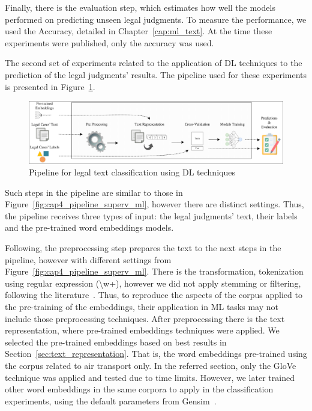 Finally, there is the evaluation step, which estimates how well the models performed on predicting unseen legal judgments. To measure the performance, we used the Accuracy, detailed in Chapter~\ref{cap:ml_text}. At the time these experiments were published, only the accuracy was used.

The second set of experiments related to the application of \gls{DL} techniques to the prediction of the legal judgments' results. The pipeline used for these experiments is presented in Figure~\ref{fig:pipeline_dl}.

\begin{figure}[htb]
    \centering
    \caption{Pipeline for legal text classification using DL techniques}
    \label{fig:pipeline_dl}
    \includegraphics[width=\textwidth]{images/chapters/cap4_proposed_pipeline_dl.pdf}
\end{figure}

Such steps in the pipeline are similar to those in Figure~\ref{fig:cap4_pipeline_superv_ml}, however there are distinct settings. 
Thus, the pipeline receives three types of input: the legal judgments' text, their labels and the pre-trained word embeddings  models. 

Following, the preprocessing step prepares the text to the next steps in the pipeline, however with  different settings from Figure~\ref{fig:cap4_pipeline_superv_ml}. There is the transformation, tokenization using regular expression (\textbackslash w+), however we did not apply stemming or filtering, following the literature~\cite{Mikolov2013, Pennington2014}. Thus, to reproduce the aspects of the corpus applied to the pre-training of the embeddings, their application in ML tasks may not include those preprocessing techniques.
After preprocessing there is the text representation, where pre-trained embeddings techniques were applied. We selected the pre-trained embeddings based on best results in Section~\ref{sec:text_representation}. That is, the word embeddings pre-trained using the corpus related to air transport only. In the referred section, only the GloVe technique was applied and tested due to time limits. However, we later trained other word embeddings in the same corpora to apply in the classification experiments, using the default parameters from Gensim~\cite{Radim2010}.


